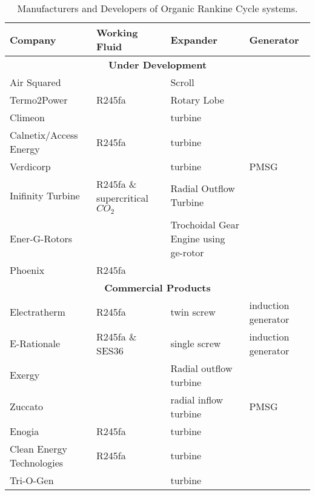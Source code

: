 \begin{table}
\centering
\caption{Manufacturers and Developers of Organic Rankine Cycle systems.}
\label{tab:orc_manufacturers}
\begin{tabular}[c]{|p{3.0cm}|p{3.0cm}|p{3.0cm}|p{3.0cm}|}
	\hline
	\textbf{Company}          & \textbf{Working Fluid}         & \textbf{Expander}                     & \textbf{Generator}                      \\ \hline
	\multicolumn{4}{|c|}{\textbf{Under Development}}	\\ \hline
	Air Squared               &                                & Scroll                                &  \\ \hline
	Termo2Power               & R245fa                         & Rotary Lobe                           &  \\ \hline
	Climeon                   &                                & turbine                               &  \\ \hline
	Calnetix/Access Energy    & R245fa                         & turbine                               &  \\ \hline
	Verdicorp                 &                                & turbine                               & PMSG \\ \hline
	Inifinity Turbine         & R245fa \& supercritical $CO_2$ & Radial Outflow Turbine                &  \\ \hline
	Ener-G-Rotors             &                                &Trochoidal Gear Engine using ge-rotor  &  \\ \hline
	Phoenix                   & R245fa                         &                                       &  \\ \hline
	\multicolumn{4}{|c|}{\textbf{Commercial Products}}	\\ \hline
	Electratherm              & R245fa                         & twin screw                            & induction generator                    \\ \hline
	E-Rationale               & R245fa \& SES36                & single screw                          & induction generator                    \\ \hline
	Exergy                    &                                & Radial outflow turbine                &  \\ \hline
	Zuccato                   &                                & radial inflow turbine                 & PMSG \\ \hline
	Enogia                    & R245fa                         & turbine                               &  \\ \hline
	Clean Energy Technologies & R245fa                         & turbine                               &  \\ \hline
	Tri-O-Gen                 &                                & turbine                               &  \\ \hline

\end{tabular}
\end{table}

